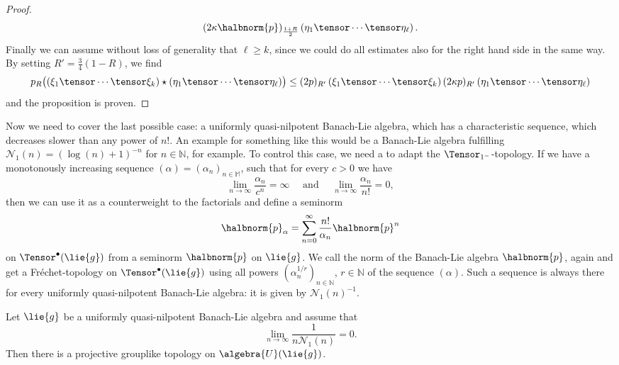 \documentclass[
11pt,                          %
english                        %
]{article}
\begin{document}
\begin{proof}
\begin{align*}
		(2 \kappa \halbnorm{p})_{\frac{1 + R}{2}} 
		\left( \eta_1 \tensor \cdots \tensor \eta_\ell \right).
	\end{align*}
	Finally we can assume without loss of generality that $\ell \geq k$, since
	we could do all estimates also for the right hand side in the same way.
	By setting $R' = \frac{3}{4}(1-R)$, we find
	\begin{equation*}
		p_R \big(
			(\xi_1 \tensor \cdots \tensor \xi_k)
			\star
			(\eta_1 \tensor \cdots \tensor \eta_\ell)
		\big)
		\leq
		(2p)_{R'}
		\left( \xi_1 \tensor \cdots \tensor \xi_k \right)
		(2 \kappa p)_{R'}
		\left( \eta_1 \tensor \cdots \tensor \eta_\ell \right)
	\end{equation*}
	and the proposition is proven.
\end{proof}

Now we need to cover the last possible case: a uniformly quasi-nilpotent Banach-Lie 
algebra, which has a characteristic sequence, which decreases slower than any power 
of $n!$. An example for something like this would be a Banach-Lie algebra fulfilling 
$\mathcal{N}_1(n) = (\log(n) + 1)^{-n}$ for $n \in \mathbb{N}$, for example. To 
control this case, we need a to adapt the $\Tensor_{1^-}$-topology. If we have a 
monotonously increasing sequence $(\alpha) = (\alpha_n)_{n \in \mathbb{M}}$, such 
that for every $c > 0$ we have
\begin{equation}
	\label{eq:increasingsequence}
	\lim\limits_{n \rightarrow \infty}
	\frac{\alpha_n}{c^n}
	=
	\infty
	\quad \text{ and } \quad
	\lim\limits_{n \rightarrow \infty}
	\frac{\alpha_n}{n!}
	=
	0,
\end{equation}
then we can use it as a counterweight to the factorials and define a seminorm
\begin{equation}
	\halbnorm{p}_\alpha
	=
	\sum\limits_{n=0}^\infty
	\frac{n!}{\alpha_n}
	\halbnorm{p}^n
\end{equation}
on $\Tensor^{\bullet}(\lie{g})$ from a seminorm $\halbnorm{p}$ on $\lie{g}$. We call 
the norm of the Banach-Lie algebra $\halbnorm{p}$, again and get a Fr\'echet-topology 
on $\Tensor^{\bullet}(\lie{g})$ using all powers $(\alpha_n^{1/r})_{n \in 
\mathbb{N}}$, $r \in \mathbb{N}$ of the sequence $(\alpha)$. Such a sequence is 
always there for every uniformly quasi-nilpotent Banach-Lie algebra: it is given by 
$\mathcal{N}_1(n)^{-1}$.
\begin{proposition}
	\label{prop:mainthm_rev_2}
	Let $\lie{g}$ be a uniformly quasi-nilpotent Banach-Lie algebra and assume that 
	\begin{equation*}
		\lim_{n \rightarrow \infty} 
		\frac{1}{n \mathcal{N}_1(n) }
		= 
		0.
	\end{equation*}
	Then there is a projective grouplike topology on $\algebra{U}(\lie{g})$.
\end{proposition}
\end{document}
